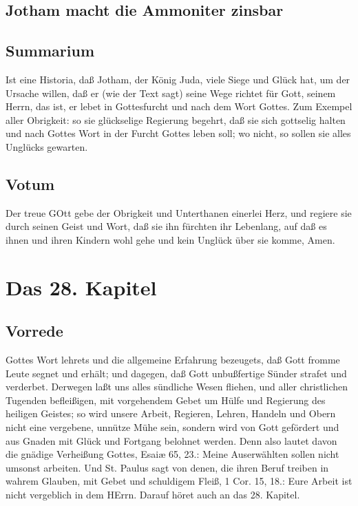 \section[Jotham macht die Ammoniter zinsbar]{Jotham macht die Ammoniter zinsbar}

\section{Summarium}

Ist eine Historia, daß Jotham, der König Juda, viele Siege und Glück hat, um der Ursache willen, daß er (wie der Text sagt) seine Wege richtet für Gott, seinem Herrn, das ist, er lebet in Gottesfurcht und nach dem Wort Gottes. Zum Exempel aller Obrigkeit: so sie glückselige Regierung begehrt, daß sie sich gottselig halten und nach Gottes Wort in der Furcht Gottes leben soll; wo nicht, so sollen sie alles Unglücks gewarten.

\section{Votum}

Der treue GOtt gebe der Obrigkeit und Unterthanen einerlei Herz, und regiere sie durch seinen Geist und Wort, daß sie ihn fürchten ihr Lebenlang, auf daß es ihnen und ihren Kindern wohl gehe und kein Unglück über sie komme, Amen.

\chapter{Das 28. Kapitel}

\section{Vorrede}

Gottes Wort lehrets und die allgemeine Erfahrung bezeugets, daß Gott fromme Leute segnet und erhält; und dagegen, daß Gott unbußfertige Sünder strafet und verderbet. Derwegen laßt uns alles sündliche Wesen fliehen, und aller christlichen Tugenden befleißigen, mit vorgehendem Gebet um Hülfe und Regierung des heiligen Geistes; so wird unsere Arbeit, Regieren, Lehren, Handeln und Obern nicht eine vergebene, unnütze Mühe sein, sondern wird von Gott gefördert und aus Gnaden mit Glück und Fortgang belohnet werden. Denn also lautet davon die gnädige Verheißung Gottes, Esaiæ 65, 23.: Meine Auserwählten sollen nicht umsonst arbeiten. Und St. Paulus sagt von denen, die ihren Beruf treiben in wahrem Glauben, mit Gebet und schuldigem Fleiß, 1 Cor. 15, 18.: Eure Arbeit ist nicht vergeblich in dem HErrn. Darauf höret auch an das 28. Kapitel.


